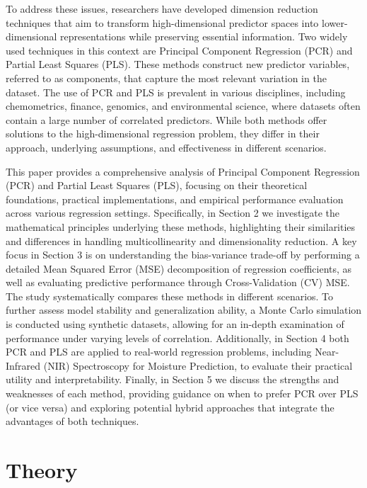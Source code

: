 \documentclass[11pt,twoside,a4paper]{article}
\begin{document}
To address these issues, researchers have developed dimension reduction techniques that aim to transform high-dimensional predictor spaces into lower-dimensional representations while preserving essential information. Two widely used techniques in this context are Principal Component Regression (PCR) and Partial Least Squares (PLS). These methods construct new predictor variables, referred to as components, that capture the most relevant variation in the dataset.
The use of PCR and PLS is prevalent in various disciplines, including chemometrics, finance, genomics, and environmental science, where datasets often contain a large number of correlated predictors. While both methods offer solutions to the high-dimensional regression problem, they differ in their approach, underlying assumptions, and effectiveness in different scenarios.

This paper provides a comprehensive analysis of  Principal Component Regression (PCR) and Partial Least Squares (PLS), focusing on their theoretical foundations, practical implementations, and empirical performance evaluation across various regression settings. Specifically, in Section 2 we investigate the mathematical principles underlying these methods, highlighting their similarities and differences in handling multicollinearity and dimensionality reduction. A key focus in Section 3 is on understanding the bias-variance trade-off by performing a detailed Mean Squared Error (MSE) decomposition of regression coefficients, as well as evaluating predictive performance through Cross-Validation (CV) MSE. The study systematically compares these methods in different scenarios. To further assess model stability and generalization ability, a Monte Carlo simulation is conducted using synthetic datasets, allowing for an in-depth examination of performance under varying levels of correlation. Additionally, in Section 4 both PCR and PLS are applied to real-world regression problems, including Near-Infrared (NIR) Spectroscopy for Moisture Prediction, to evaluate their practical utility and interpretability. Finally, in Section 5 we discuss the strengths and weaknesses of each method, providing guidance on when to prefer PCR over PLS (or vice versa) and exploring potential hybrid approaches that integrate the advantages of both techniques.
\newpage

\section{Theory}
\end{document}

